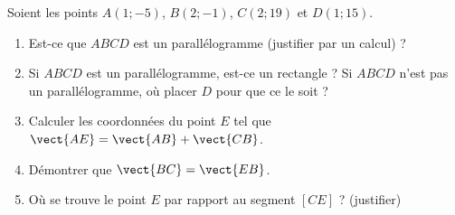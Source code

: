 
\begin{exercice}\label{exosmath-0670}

    Soient les points \( A(1;-5)\), \( B(2;-1)\), \( C(2;19)\) et \( D(1;15)\).
    \begin{enumerate}
        \item
            Est-ce que \( ABCD\) est un parallélogramme (justifier par un calcul) ?
        \item
            Si \( ABCD\) est un parallélogramme, est-ce un rectangle ? Si \( ABCD\) n'est pas un parallélogramme, où placer \( D\) pour que ce le soit ?
        \item
            Calculer les coordonnées du point \( E\) tel que \( \vect{ AE }=\vect{ AB }+\vect{ CB }\).
        \item
            Démontrer que \( \vect{ BC }=\vect{ EB }\).
        \item
            Où se trouve le point \( E\) par rapport au segment \( [CE]\) ? (justifier)
    \end{enumerate}


\end{exercice}

